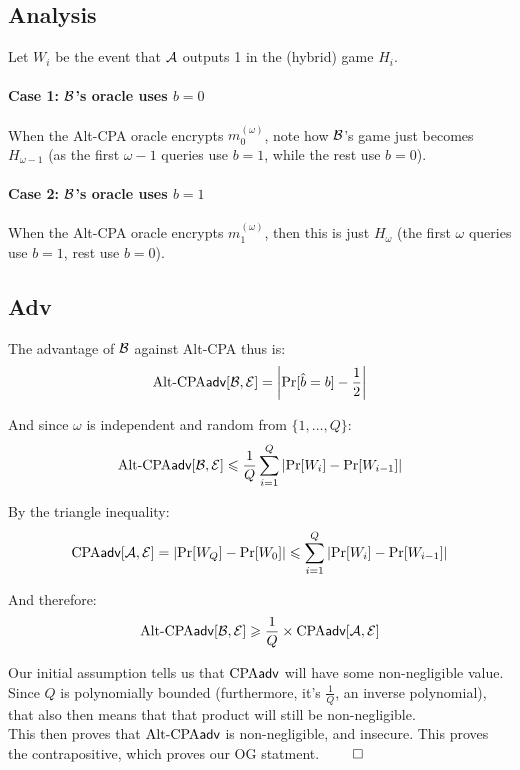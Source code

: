 \documentclass[12pt]{article}
\theoremstyle{plain}
\theoremstyle{definition}
\begin{document}
\begin{solution}
\subsection*{Analysis}
Let $W_i$ be the event that $\mathcal{A}$ outputs 1 in the (hybrid) game $H_i$.

\paragraph{Case 1: $\mathcal{B}$'s oracle uses $b=0$}
When the Alt-CPA oracle encrypts $m_0^{(\omega)}$, note how $\mathcal{B}$'s game just becomes $H_{\omega-1}$ (as the first $\omega-1$ queries use $b=1$, while the rest use $b=0$).

\paragraph{Case 2: $\mathcal{B}$'s oracle uses $b=1$}
When the Alt-CPA oracle encrypts $m_1^{(\omega)}$, then this is just $H_{\omega}$ (the first $\omega$ queries use $b=1$, rest use $b=0$).

\subsection*{Adv}
The advantage of $\mathcal{B}$ against Alt-CPA thus is:
\begin{equation*}
\textrm{Alt-CPA}\textsf{adv}[\mathcal{B}, \mathcal{E}] = \left|\Pr[\hat{b} = b] - \frac{1}{2}\right|
\end{equation*}

\noindent And since $\omega$ is independent and random from $\{1, \ldots, Q\}$:
\begin{equation*}
\textrm{Alt-CPA}\textsf{adv}[\mathcal{B}, \mathcal{E}] \leqslant \frac{1}{Q} \sum_{i=1}^{Q} \left|\Pr[W_i] - \Pr[W_{i-1}]\right|
\end{equation*}

\noindent By the triangle inequality:
\begin{equation*}
\textrm{CPA}\textsf{adv}[\mathcal{A}, \mathcal{E}] = \left|\Pr[W_Q] - \Pr[W_0]\right| \leqslant \sum_{i=1}^{Q} \left|\Pr[W_i] - \Pr[W_{i-1}]\right|
\end{equation*}

\noindent And therefore:
\begin{equation*}
\textrm{Alt-CPA}\textsf{adv}[\mathcal{B}, \mathcal{E}] \geqslant \frac{1}{Q} \times \textrm{CPA}\textsf{adv}[\mathcal{A}, \mathcal{E}]
\end{equation*}

\noindent Our initial assumption tells us that $\textrm{CPA}\textsf{adv}$ will have some non-negligible value.
Since $Q$ is polynomially bounded (furthermore, it's $\frac{1}{Q}$, an inverse polynomial), that also then means that that product will still be non-negligible.\\

\noindent This then proves that $\textrm{Alt-CPA}\textsf{adv}$ is non-negligible, and insecure. This proves the contrapositive, which proves our OG statment. $\qed$
\end{solution}
\end{document}
